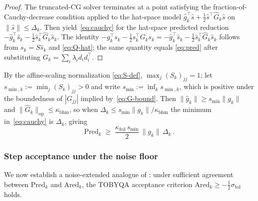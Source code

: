 \documentclass[11pt,a4paper]{article}
\begin{document}
\begin{proof}
The truncated-CG solver \cite{Powell2006NEWUOA} terminates at a
point satisfying the fraction-of-Cauchy-decrease condition
\cite[Assumption~2.1]{ConnScheinbergVicente2009SIOPT} applied to
the hat-space model
$\hat g_k^{\!\top}\hat s+\tfrac{1}{2}\hat s^{\!\top}\hat G_k\hat s$
on $\|\hat s\|\le\Delta_k$. Then
\cite[Theorem~2.1 and~(2.6)]{ConnScheinbergVicente2009SIOPT}
yield~\eqref{eq:cauchy} for the hat-space predicted reduction
$-\hat g_k^{\!\top}\hat s_k
 -\tfrac{1}{2}\hat s_k^{\!\top}\hat G_k\hat s_k$. The identity
$-g_k^{\!\top}s_k-\tfrac{1}{2}s_k^{\!\top}G_ks_k
 =-\hat g_k^{\!\top}\hat s_k
  -\tfrac{1}{2}\hat s_k^{\!\top}\hat G_k\hat s_k$
follows from $s_k=S\hat s_k$ and \eqref{eq:Q-hat}; the same
quantity equals \eqref{eq:pred} after substituting
$G_k=\sum_i\lambda_id_id_i^{\!\top}$.
\end{proof}

By the affine-scaling normalization \eqref{eq:S-def},
$\max_j(S_k)_{jj}=1$; let $s_{\min,k}:=\min_j(S_k)_{jj}>0$ and
write $s_{\min}:=\inf_k s_{\min,k}$, which is positive under
the boundedness of $|G_{jj}|$ implied by~\eqref{eq:G-bound}.
Then $\|\hat g_k\|\ge s_{\min}\|g_k\|$ and
$\|\hat G_k\|_{\mathrm{op}}\le\kappa_{\mathrm{bhm}}$, so when
$\Delta_k\le s_{\min}\|g_k\|/\kappa_{\mathrm{bhm}}$ the minimum
in~\eqref{eq:cauchy} is $\Delta_k$, giving
\begin{equation}\label{eq:pred-lower}
  \mathrm{Pred}_k\;\ge\;
  \frac{\kappa_{\mathrm{fcd}}\,s_{\min}}{2}\,\|g_k\|\,\Delta_k\,.
\end{equation}

\subsubsection*{Step acceptance under the noise floor}

We now establish a noise-extended analogue of
\cite[Lemma~5.2]{ConnScheinbergVicente2009SIOPT}: under
sufficient agreement between $\mathrm{Pred}_k$ and
$\mathrm{Ared}_k$, the TOBYQA acceptance criterion
$\mathrm{Ared}_k\ge-\tfrac{1}{2}\sigma_{\mathrm{tol}}$ holds.
\end{document}

